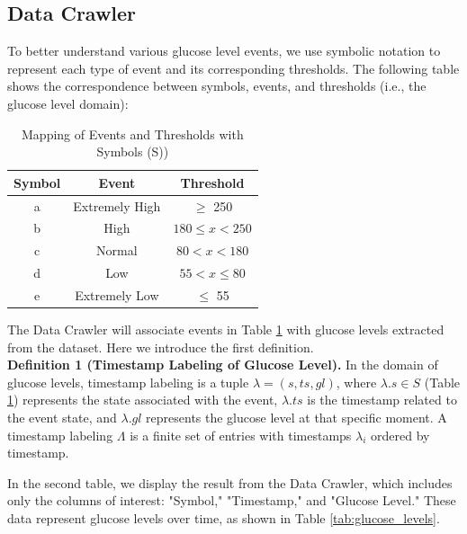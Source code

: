 \documentclass{article}
\begin{document}
\subsection{Data Crawler}

To better understand various glucose level events, we use symbolic notation to represent each type of event and its corresponding thresholds. The following table shows the correspondence between symbols, events, and thresholds (i.e., the glucose level domain):


\begin{table}[h!]
    \centering
    \begin{tabular}{|c|c|c|}
        \hline
        \textbf{Symbol} & \textbf{Event} & \textbf{Threshold} \\
        \hline
        a & Extremely High & $\geq$ 250 \\
        b & High & $ 180 \leq  x < 250$ \\
        c & Normal & $80 < x < 180$ \\
        d & Low & $55 < x \leq 80$ \\
        e & Extremely Low & $\leq$ 55 \\
        \hline
    \end{tabular}
    \caption{Mapping of Events and Thresholds with Symbols (S))}
    \label{tab:events}
\end{table}

The Data Crawler will associate events in Table \ref{tab:events} with glucose levels extracted from the dataset. Here we introduce the first definition.\\

\textbf{Definition 1 (Timestamp Labeling of Glucose Level).} In the domain of glucose levels, timestamp labeling is a tuple \(\lambda = (s, ts, gl)\), where \(\lambda.s \in S\) (Table \ref{tab:events}) represents the state associated with the event, \(\lambda.ts\) is the timestamp related to the event state, and \(\lambda.gl\) represents the glucose level at that specific moment. A timestamp labeling \(\Lambda\) is a finite set of entries with timestamps \(\lambda_i\) ordered by timestamp.

In the second table, we display the result from the Data Crawler, which includes only the columns of interest: "Symbol," "Timestamp," and "Glucose Level." These data represent glucose levels over time, as shown in Table \ref{tab:glucose_levels}.
\end{document}
